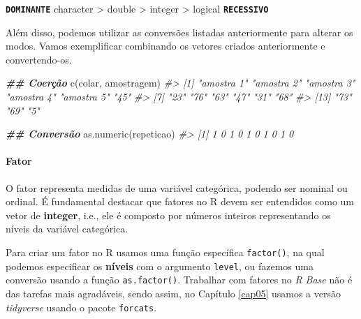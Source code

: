 \documentclass[
]{book}
\newenvironment{Shaded}{\begin{snugshade}}{\end{snugshade}}
\newcommand{\CommentTok}[1]{\textcolor[rgb]{0.37,0.37,0.37}{\textit{#1}}}
\newcommand{\DocumentationTok}[1]{\textcolor[rgb]{0.37,0.37,0.37}{\textbf{\textit{#1}}}}
\newcommand{\FunctionTok}[1]{\textcolor[rgb]{0,0,0}{#1}}
\newcommand{\NormalTok}[1]{#1}
\renewenvironment{quote}{\begin{VF}}{\end{VF}}
\begin{document}
\begin{quote}
\textbf{\texttt{DOMINANTE}} character \textgreater{} double \textgreater{} integer \textgreater{} logical \textbf{\texttt{RECESSIVO}}
\end{quote}

Além disso, podemos utilizar as conversões listadas anteriormente para alterar os modos. Vamos exemplificar combinando os vetores criados anteriormente e convertendo-os.

\begin{Shaded}
\begin{Highlighting}[]
\DocumentationTok{\#\# Coerção}
\FunctionTok{c}\NormalTok{(colar, amostragem)}
\CommentTok{\#\textgreater{}  [1] "amostra 1" "amostra 2" "amostra 3" "amostra 4" "amostra 5" "45"       }
\CommentTok{\#\textgreater{}  [7] "23"        "76"        "63"        "47"        "31"        "68"       }
\CommentTok{\#\textgreater{} [13] "73"        "69"        "5"}

\DocumentationTok{\#\# Conversão}
\FunctionTok{as.numeric}\NormalTok{(repeticao)}
\CommentTok{\#\textgreater{}  [1] 1 0 1 0 1 0 1 0 1 0}
\end{Highlighting}
\end{Shaded}

\hypertarget{fator}{%
\paragraph{Fator}\label{fator}}

O fator representa medidas de uma variável categórica, podendo ser nominal ou ordinal. É fundamental destacar que fatores no R devem ser entendidos como um vetor de \textbf{integer}, i.e., ele é composto por números inteiros representando os níveis da variável categórica.

Para criar um fator no R usamos uma função específica \texttt{factor()}, na qual podemos especificar os \textbf{níveis} com o argumento \texttt{level}, ou fazemos uma conversão usando a função \texttt{as.factor()}. Trabalhar com fatores no \emph{R Base} não é das tarefas mais agradáveis, sendo assim, no Capítulo \ref{cap05} usamos a versão \emph{tidyverse} usando o pacote \texttt{forcats}.
\end{document}
